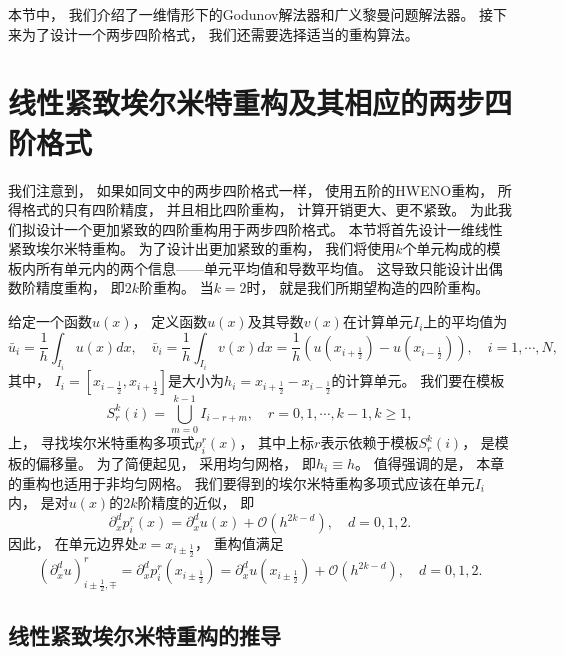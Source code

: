 \vspace{\baselineskip} %
本节中，
我们介绍了一维情形下的Godunov解法器和广义黎曼问题解法器。
接下来为了设计一个两步四阶格式，
我们还需要选择适当的重构算法。

\section{线性紧致埃尔米特重构及其相应的两步四阶格式}
\label{sec:1D-linear-rec}

我们注意到，
如果如同文\cite{du2018hermite}中的两步四阶格式一样，
使用五阶的HWENO重构，
所得格式的只有四阶精度，
并且相比四阶重构，
计算开销更大、更不紧致。
为此我们拟设计一个更加紧致的四阶重构用于两步四阶格式。
本节将首先设计一维线性紧致埃尔米特重构。
为了设计出更加紧致的重构，
我们将使用$k$个单元构成的模板内所有单元内的两个信息——单元平均值和导数平均值。
这导致只能设计出偶数阶精度重构，
即$2k$阶重构。
当$k=2$时，
就是我们所期望构造的四阶重构。

给定一个函数$u(x)$，
定义函数$u(x)$及其导数$v(x)$在计算单元$I_{i}$上的平均值为
\begin{equation}
  \bar u_{i} = \frac {1}{h} \int_{I_{i}} u(x)dx, \quad
  \bar v_{i} = \frac {1}{h} \int_{I_{i}} v(x)dx = \frac{1}{h} (u(x_{i+\frac 12})-u(x_{i-\frac 12})), \quad
  i=1,\cdots, N,
\end{equation}
其中，
$I_{i}=[x_{i-\frac 12},x_{i+\frac 12}]$是大小为$h_i=x_{i+\frac 12}-x_{i-\frac 12}$的计算单元。
我们要在模板
\begin{equation}
  \label{eq:stencils}
  S^k_{r}(i) = \bigcup_{m=0}^{k-1} I_{i-r+m}, \quad
  r=0,1,\cdots, k-1, k\ge 1,
\end{equation}
上，
寻找埃尔米特重构多项式$p^r_i(x)$，
其中上标$r$表示依赖于模板$S^k_r(i)$，
是模板的偏移量。
为了简便起见，
采用均匀网格，
即$h_i\equiv h$。
值得强调的是，
本章的重构也适用于非均匀网格。
我们要得到的埃尔米特重构多项式应该在单元$I_{i}$内，
是对$u(x)$的$2k$阶精度的近似，
即
\begin{equation}
  {\partial_x^d}p^r_i(x) ={\partial_x^d} u(x) +\mathcal{O}(h^{2k-d}),\quad
  d=0,1,2.
\end{equation}
因此，
在单元边界处$x=x_{i\pm \frac 12}$，
重构值满足
\begin{equation}
  ({\partial_x^d} u)_{i\pm \frac 12,\mp}^r = {\partial_x^d}p^r_i(x_{i\pm \frac 12})={\partial_x^d} u(x_{i\pm\frac 12})+\mathcal{O}(h^{2k-d}),\quad
  d=0,1,2.
\end{equation}

\subsection{线性紧致埃尔米特重构的推导}

